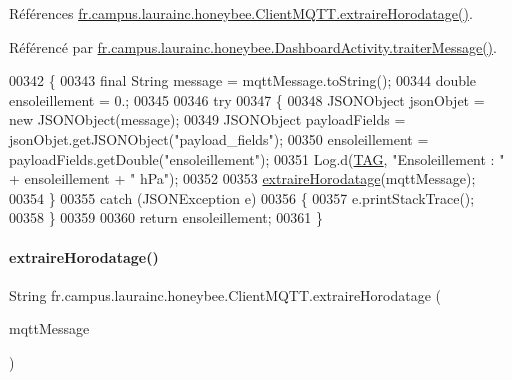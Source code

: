 Références \hyperlink{classfr_1_1campus_1_1laurainc_1_1honeybee_1_1_client_m_q_t_t_ace17d633909a5be8035518b9a6b528c2}{fr.\+campus.\+laurainc.\+honeybee.\+Client\+M\+Q\+T\+T.\+extraire\+Horodatage()}.



Référencé par \hyperlink{classfr_1_1campus_1_1laurainc_1_1honeybee_1_1_dashboard_activity_a50d4c14e993ff1779ae5dce8cee11216}{fr.\+campus.\+laurainc.\+honeybee.\+Dashboard\+Activity.\+traiter\+Message()}.


\begin{DoxyCode}
00342     \{
00343         \textcolor{keyword}{final} String message = mqttMessage.toString();
00344         \textcolor{keywordtype}{double} ensoleillement = 0.;
00345 
00346         \textcolor{keywordflow}{try}
00347         \{
00348             JSONObject jsonObjet = \textcolor{keyword}{new} JSONObject(message);
00349             JSONObject payloadFields = jsonObjet.getJSONObject(\textcolor{stringliteral}{"payload\_fields"});
00350             ensoleillement = payloadFields.getDouble(\textcolor{stringliteral}{"ensoleillement"});
00351             Log.d(\hyperlink{classfr_1_1campus_1_1laurainc_1_1honeybee_1_1_client_m_q_t_t_a378324f705f8d7870c5f7be0cea02890}{TAG}, \textcolor{stringliteral}{"Ensoleillement : "} + ensoleillement + \textcolor{stringliteral}{" hPa"});
00352 
00353             \hyperlink{classfr_1_1campus_1_1laurainc_1_1honeybee_1_1_client_m_q_t_t_ace17d633909a5be8035518b9a6b528c2}{extraireHorodatage}(mqttMessage);
00354         \}
00355         \textcolor{keywordflow}{catch} (JSONException e)
00356         \{
00357             e.printStackTrace();
00358         \}
00359 
00360         \textcolor{keywordflow}{return}  ensoleillement;
00361     \}
\end{DoxyCode}
\mbox{\label{classfr_1_1campus_1_1laurainc_1_1honeybee_1_1_client_m_q_t_t_ace17d633909a5be8035518b9a6b528c2}} 
\paragraph{\texorpdfstring{extraire\+Horodatage()}{extraireHorodatage()}}
{\footnotesize\ttfamily String fr.\+campus.\+laurainc.\+honeybee.\+Client\+M\+Q\+T\+T.\+extraire\+Horodatage (\begin{DoxyParamCaption}\item[{Mqtt\+Message}]{mqtt\+Message }\end{DoxyParamCaption})}



